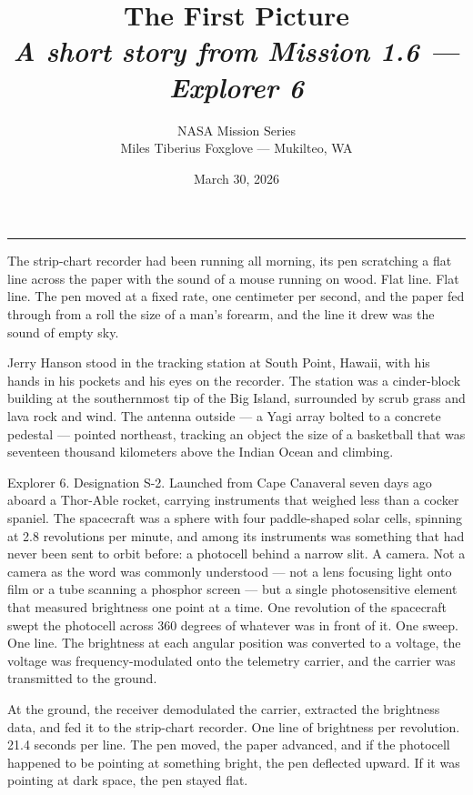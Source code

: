 \documentclass[12pt, letterpaper]{article}
\title{\Huge\textbf{The First Picture}\\[0.5em]\large\textit{A short story from Mission 1.6 --- Explorer 6}}
\author{NASA Mission Series\\[0.3em]\small Miles Tiberius Foxglove --- Mukilteo, WA}
\date{March 30, 2026}
\begin{document}
\maketitle
\thispagestyle{empty}

\vspace{1em}
\noindent\rule{\textwidth}{0.4pt}
\vspace{1em}

\noindent The strip-chart recorder had been running all morning, its pen scratching a flat line across the paper with the sound of a mouse running on wood. Flat line. Flat line. The pen moved at a fixed rate, one centimeter per second, and the paper fed through from a roll the size of a man's forearm, and the line it drew was the sound of empty sky.

Jerry Hanson stood in the tracking station at South Point, Hawaii, with his hands in his pockets and his eyes on the recorder. The station was a cinder-block building at the southernmost tip of the Big Island, surrounded by scrub grass and lava rock and wind. The antenna outside --- a Yagi array bolted to a concrete pedestal --- pointed northeast, tracking an object the size of a basketball that was seventeen thousand kilometers above the Indian Ocean and climbing.

Explorer 6. Designation S-2. Launched from Cape Canaveral seven days ago aboard a Thor-Able rocket, carrying instruments that weighed less than a cocker spaniel. The spacecraft was a sphere with four paddle-shaped solar cells, spinning at 2.8 revolutions per minute, and among its instruments was something that had never been sent to orbit before: a photocell behind a narrow slit. A camera. Not a camera as the word was commonly understood --- not a lens focusing light onto film or a tube scanning a phosphor screen --- but a single photosensitive element that measured brightness one point at a time. One revolution of the spacecraft swept the photocell across 360 degrees of whatever was in front of it. One sweep. One line. The brightness at each angular position was converted to a voltage, the voltage was frequency-modulated onto the telemetry carrier, and the carrier was transmitted to the ground.

At the ground, the receiver demodulated the carrier, extracted the brightness data, and fed it to the strip-chart recorder. One line of brightness per revolution. 21.4 seconds per line. The pen moved, the paper advanced, and if the photocell happened to be pointing at something bright, the pen deflected upward. If it was pointing at dark space, the pen stayed flat.
\end{document}
